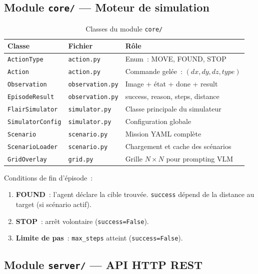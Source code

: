 \documentclass[a4paper, 11pt, french]{article}
\newcommand{\code}[1]{\texttt{#1}}
\begin{document}
\subsection{Module \code{core/} --- Moteur de simulation}

\begin{table}[H]
\centering\small
\begin{tabular}{llp{7.5cm}}
\toprule
\textbf{Classe} & \textbf{Fichier} & \textbf{Rôle} \\
\midrule
\code{ActionType}      & \code{action.py}      & Enum~: MOVE, FOUND, STOP \\
\code{Action}          & \code{action.py}      & Commande gelée~: $(dx, dy, dz, type)$ \\
\code{Observation}     & \code{observation.py}  & Image + état + done + result \\
\code{EpisodeResult}   & \code{observation.py}  & success, reason, steps, distance \\
\code{FlairSimulator}  & \code{simulator.py}    & Classe principale du simulateur \\
\code{SimulatorConfig} & \code{simulator.py}    & Configuration globale \\
\code{Scenario}        & \code{scenario.py}     & Mission YAML complète \\
\code{ScenarioLoader}  & \code{scenario.py}     & Chargement et cache des scénarios \\
\code{GridOverlay}     & \code{grid.py}         & Grille $N{\times}N$ pour prompting VLM \\
\bottomrule
\end{tabular}
\caption{Classes du module \code{core/}}
\end{table}

Conditions de fin d'épisode~:
\begin{enumerate}
  \item \textbf{FOUND}~: l'agent déclare la cible trouvée. \code{success}
        dépend de la distance au target (si scénario actif).
  \item \textbf{STOP}~: arrêt volontaire (\code{success=False}).
  \item \textbf{Limite de pas}~: \code{max\_steps} atteint
        (\code{success=False}).
\end{enumerate}

\subsection{Module \code{server/} --- API HTTP REST}
\end{document}
